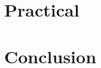 \documentclass{mimosis}
\begin{document}
\part[Practical]{%
	Practical\\
}\label{part:practical}



\part[Conclusion]{%
	Conclusion\\
}\label{part:conclusion}


\backmatter

\begingroup
\let\clearpage\relax
\glsaddall
\printglossary[type=\acronymtype]
\newpage
\printglossary
\endgroup

\printindex
\printbibliography
\end{document}
